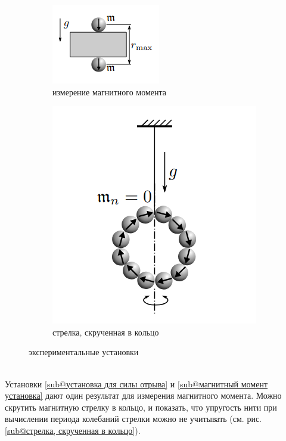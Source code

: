 \documentclass[a4paper, 10pt]{article}
\begin{document}
\begin{figure}[htbp]
\begin{subfigure}{0.2\textwidth}
            \includegraphics[width=\linewidth]{p3.png}
            \caption{измерение магнитного момента}
            \label{магнитный момент установка}
        \end{subfigure}
        \begin{subfigure}{0.2\linewidth}
            \includegraphics[width=\linewidth]{p4.png}
            \caption{стрелка, скрученная в кольцо}
            \label{стрелка, скрученная в кольцо}
        \end{subfigure}
        \caption{экспериментальные установки}
        \label{установки}
    \end{figure}\\
Установки \ref{sub@установка для силы отрыва} и \ref{sub@магнитный момент установка} дают один результат для измерения магнитного момента. Можно скрутить магнитную стрелку в кольцо, и
показать, что упругость нити при вычислении периода колебаний стрелки можно не учитывать (см. рис. \ref{sub@стрелка, скрученная в кольцо}).
\end{document}
